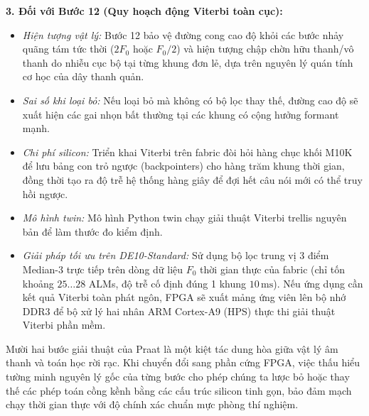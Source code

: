 \textbf{3. Đối với Bước 12 (Quy hoạch động Viterbi toàn cục):}
\begin{itemize}[leftmargin=1.2em]
    \item \emph{Hiện tượng vật lý:} Bước 12 bảo vệ đường cong cao độ khỏi các bước nhảy quãng tám tức thời ($2F_0$ hoặc $F_0/2$) và hiện tượng chập chờn hữu thanh/vô thanh do nhiễu cục bộ tại từng khung đơn lẻ, dựa trên nguyên lý quán tính cơ học của dây thanh quản.
    \item \emph{Sai số khi loại bỏ:} Nếu loại bỏ mà không có bộ lọc thay thế, đường cao độ sẽ xuất hiện các gai nhọn bất thường tại các khung có cộng hưởng formant mạnh.
    \item \emph{Chi phí silicon:} Triển khai Viterbi trên fabric đòi hỏi hàng chục khối M10K để lưu bảng con trỏ ngược (backpointers) cho hàng trăm khung thời gian, đồng thời tạo ra độ trễ hệ thống hàng giây để đợi hết câu nói mới có thể truy hồi ngược.
    \item \emph{Mô hình twin:} Mô hình Python twin chạy giải thuật Viterbi trellis nguyên bản để làm thước đo kiểm định.
    \item \emph{Giải pháp tối ưu trên DE10-Standard:} Sử dụng bộ lọc trung vị 3 điểm Median-3 trực tiếp trên dòng dữ liệu $F_0$ thời gian thực của fabric (chỉ tốn khoảng $25 \ldots 28$ ALMs, độ trễ cố định đúng 1 khung $10\,\text{ms}$). Nếu ứng dụng cần kết quả Viterbi toàn phát ngôn, FPGA sẽ xuất mảng ứng viên lên bộ nhớ DDR3 để bộ xử lý hai nhân ARM Cortex-A9 (HPS) thực thi giải thuật Viterbi phần mềm.
\end{itemize}

\begin{physicalinsight}
Mười hai bước giải thuật của Praat là một kiệt tác dung hòa giữa vật lý âm thanh và toán học rời rạc. Khi chuyển đổi sang phần cứng FPGA, việc thấu hiểu tường minh nguyên lý gốc của từng bước cho phép chúng ta lược bỏ hoặc thay thế các phép toán cồng kềnh bằng các cấu trúc silicon tinh gọn, bảo đảm mạch chạy thời gian thực với độ chính xác chuẩn mực phòng thí nghiệm.
\end{physicalinsight}
